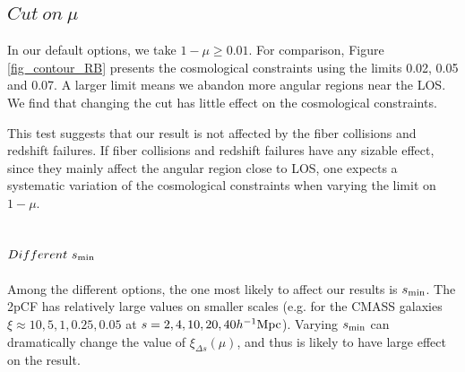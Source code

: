 \documentclass[iop]{emulateapj}
\begin{document}
\subsection{$Cut\ on\ \mu$}

In our default options, we take $1 - \mu\ge0.01$.
For comparison, Figure \ref{fig_contour_RB} presents the cosmological constraints using the limits 
0.02, 0.05 and 0.07. 
A larger limit means we abandon more angular regions near the LOS.
We find that changing the cut has little effect on the cosmological constraints.

This test suggests that our result is not affected by the fiber collisions and redshift failures.
If fiber collisions and redshift failures have any sizable effect,
since they mainly affect the angular region close to LOS,
one expects a systematic variation of the cosmological constraints when varying the limit on $1-\mu$.



\subsection{$Different\ s_{\rm min}$}


Among the different options, %
the one most likely to affect our results is $s_{\rm min}$.
The 2pCF has relatively large values on smaller scales
(e.g. for the CMASS galaxies $\xi\approx10,5,1,0.25,0.05$ at $s=2,4,10,20,40 h^{-1}{\rm Mpc}$).
Varying $s_{\rm min}$ can dramatically change the value of $\xi_{\Delta s}(\mu)$,
and thus is likely to have large effect on the result.
\end{document}
